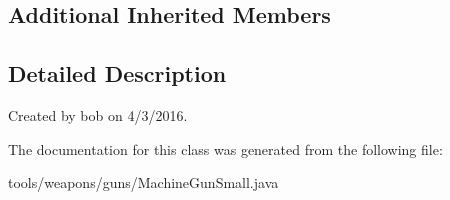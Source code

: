 \subsection*{Additional Inherited Members}


\subsection{Detailed Description}
Created by bob on 4/3/2016. 

The documentation for this class was generated from the following file\+:\begin{DoxyCompactItemize}
\item 
tools/weapons/guns/Machine\+Gun\+Small.\+java\end{DoxyCompactItemize}
